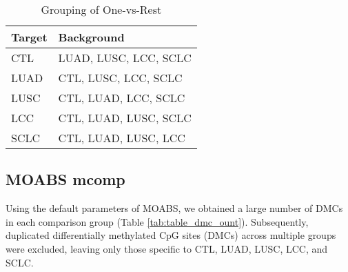 \documentclass[12pt,letterpaper]{article}
\begin{document}
\begin{table}[H]
    \begin{center}
        \caption{ Grouping of One-vs-Rest }
        \begin{tabular}{|l|l|}
            \hline
            Target & Background            \\
            \hline
            CTL    & LUAD, LUSC, LCC, SCLC \\
            LUAD   & CTL, LUSC, LCC, SCLC  \\
            LUSC   & CTL, LUAD, LCC, SCLC  \\
            LCC    & CTL, LUAD, LUSC, SCLC \\
            SCLC   & CTL, LUAD, LUSC, LCC  \\
            \hline
        \end{tabular}
    \end{center}
    \label{tab:grouping}
\end{table}

\subsection{MOABS mcomp}

Using the default parameters of MOABS, we obtained a large number of DMCs in each comparison group 
(Table \ref{tab:table_dmc_ount}). Subsequently, duplicated differentially methylated CpG sites (DMCs) 
across multiple groups were excluded, leaving only those specific to CTL, LUAD, LUSC, LCC, and SCLC.
\end{document}
